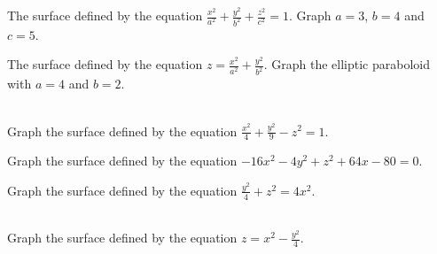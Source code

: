 \documentclass[mathNotesPreamble]{subfiles}
\begin{document}
    \begin{ex*}[An ellipsoid]
      The surface defined by the equation $\displaystyle \frac{x^2}{a^2}+\frac{y^2}{b^2}+\frac{z^2}{c^2}=1$. Graph $a=3$, $b=4$ and $c=5$.
    \end{ex*}
    \pagebreak

    \begin{ex*}
      The surface defined by the equation $\displaystyle z=\frac{x^2}{a^2}+\frac{y^2}{b^2}$. Graph the elliptic paraboloid with $a=4$ and $b=2$.
    \end{ex*}
    \pagebreak

    \begin{ex*}\mbox{}\\
      Graph the surface defined by the equation $\displaystyle \frac{x^2}{4}+\frac{y^2}{9}-z^2=1$.
    \end{ex*}
    \pagebreak
    
    \begin{ex*}
      Graph the surface defined by the equation $-16x^2-4y^2+z^2+64x-80=0.$
    \end{ex*}
    \pagebreak

    \begin{ex*}
      Graph the surface defined by the equation $\displaystyle \frac{y^2}{4}+z^2=4x^2$.
    \end{ex*}
    \pagebreak

    \begin{ex*}\mbox{}\\
      Graph the surface defined by the equation $\displaystyle z=x^2-\frac{y^2}{4}$. 
    \end{ex*}
    \pagebreak

    
  
\end{document}
